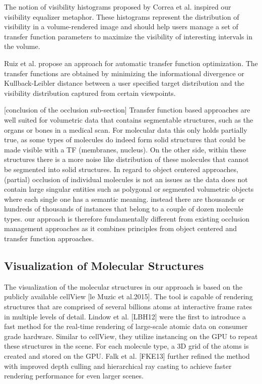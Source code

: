 The notion of visibility histograms proposed by Correa et al. inspired our visibility equalizer metaphor. These histograms represent the distribution of visibility in a volume-rendered image and should help users manage a set of transfer function parameters to maximize the visibility of interesting intervals in the volume.

Ruiz et al. propose an approach for automatic transfer function optimization. The transfer functions are obtained by minimizing the informational divergence or Kullback-Leibler distance between a user specified target distribution and the visibility distribution captured from certain viewpoints. 



[conclusion of the occlusion sub-section]
Transfer function based approaches are well suited for volumetric data that contains segmentable structures, such as the organs or bones in a medical scan. For molecular data this only holds partially true, as some types of molecules do indeed form solid structures that could be made visible with a TF (membranes, nucleus). 	On the other side, within these structures there is a more noise like distribution of these molecules that cannot be segmented into solid structures. 
In regard to object centered approaches, (partial) occlusion of individual molecules is not an issues as the data does not contain large singular entities such as polygonal or segmented volumetric objects where each single one has a semantic meaning. instead there are thousands or hundreds of thousands of instances that belong to a couple of dozen molecule types.
 our approach is therefore fundamentally different from existing occlusion management approaches as it combines principles from object centered and transfer function approaches. 


\subsection{Visualization of Molecular Structures}
The visualization of the molecular structures in our approach is based on the publicly available cellView [le Muzic et al.2015]. The tool is capable of rendering structures that are comprised of several billions atoms at interactive frame rates in multiple levels of detail.  
Lindow et al. [LBH12] were the ﬁrst to introduce a fast method for the real-time rendering of large-scale atomic data on consumer grade hardware. Similar to cellView, they utilize instancing on the GPU to repeat these structures in the scene. For each molecule type, a 3D grid of the atoms is created and stored on the GPU. Falk et al. [FKE13] further refined the method with improved depth culling and hierarchical ray casting to achieve faster rendering performance for even larger scenes. 

